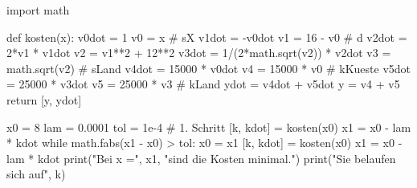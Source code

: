 \documentclass[
  a4paper,
  DIV=11]{scrreprt}
\newenvironment{Shaded}{\begin{snugshade}}{\end{snugshade}}
\newcommand{\BuiltInTok}[1]{\textcolor[rgb]{0.00,0.23,0.31}{#1}}
\newcommand{\CommentTok}[1]{\textcolor[rgb]{0.37,0.37,0.37}{#1}}
\newcommand{\ControlFlowTok}[1]{\textcolor[rgb]{0.00,0.23,0.31}{#1}}
\newcommand{\DecValTok}[1]{\textcolor[rgb]{0.68,0.00,0.00}{#1}}
\newcommand{\FloatTok}[1]{\textcolor[rgb]{0.68,0.00,0.00}{#1}}
\newcommand{\ImportTok}[1]{\textcolor[rgb]{0.00,0.46,0.62}{#1}}
\newcommand{\KeywordTok}[1]{\textcolor[rgb]{0.00,0.23,0.31}{#1}}
\newcommand{\NormalTok}[1]{\textcolor[rgb]{0.00,0.23,0.31}{#1}}
\newcommand{\OperatorTok}[1]{\textcolor[rgb]{0.37,0.37,0.37}{#1}}
\newcommand{\StringTok}[1]{\textcolor[rgb]{0.13,0.47,0.30}{#1}}
\theoremstyle{definition}
\theoremstyle{definition}
\theoremstyle{remark}
\begin{document}
\begin{tcolorbox}[enhanced jigsaw, titlerule=0mm, title=\textcolor{quarto-callout-tip-color}{\faLightbulb}\hspace{0.5em}{Lösung}, breakable, coltitle=black, leftrule=.75mm, bottomrule=.15mm, colback=white, rightrule=.15mm, opacitybacktitle=0.6, bottomtitle=1mm, toptitle=1mm, left=2mm, toprule=.15mm, colbacktitle=quarto-callout-tip-color!10!white, colframe=quarto-callout-tip-color-frame, arc=.35mm, opacityback=0]

\begin{Shaded}
\begin{Highlighting}[]
\ImportTok{import}\NormalTok{ math}

\KeywordTok{def}\NormalTok{ kosten(x):}
\NormalTok{    v0dot }\OperatorTok{=} \DecValTok{1}
\NormalTok{    v0 }\OperatorTok{=}\NormalTok{ x       }\CommentTok{\# sX}
\NormalTok{    v1dot }\OperatorTok{=} \OperatorTok{{-}}\NormalTok{v0dot}
\NormalTok{    v1 }\OperatorTok{=} \DecValTok{16} \OperatorTok{{-}}\NormalTok{ v0 }\CommentTok{\# d}
\NormalTok{    v2dot }\OperatorTok{=} \DecValTok{2}\OperatorTok{*}\NormalTok{v1 }\OperatorTok{*}\NormalTok{ v1dot}
\NormalTok{    v2 }\OperatorTok{=}\NormalTok{ v1}\OperatorTok{**}\DecValTok{2} \OperatorTok{+} \DecValTok{12}\OperatorTok{**}\DecValTok{2}
\NormalTok{    v3dot }\OperatorTok{=} \DecValTok{1}\OperatorTok{/}\NormalTok{(}\DecValTok{2}\OperatorTok{*}\NormalTok{math.sqrt(v2)) }\OperatorTok{*}\NormalTok{ v2dot}
\NormalTok{    v3 }\OperatorTok{=}\NormalTok{ math.sqrt(v2) }\CommentTok{\# sLand}
\NormalTok{    v4dot }\OperatorTok{=} \DecValTok{15000} \OperatorTok{*}\NormalTok{ v0dot}
\NormalTok{    v4 }\OperatorTok{=} \DecValTok{15000} \OperatorTok{*}\NormalTok{ v0 }\CommentTok{\# kKueste}
\NormalTok{    v5dot }\OperatorTok{=} \DecValTok{25000} \OperatorTok{*}\NormalTok{ v3dot}
\NormalTok{    v5 }\OperatorTok{=} \DecValTok{25000} \OperatorTok{*}\NormalTok{ v3 }\CommentTok{\# kLand}
\NormalTok{    ydot }\OperatorTok{=}\NormalTok{ v4dot }\OperatorTok{+}\NormalTok{ v5dot}
\NormalTok{    y }\OperatorTok{=}\NormalTok{ v4 }\OperatorTok{+}\NormalTok{ v5}
    \ControlFlowTok{return}\NormalTok{ [y, ydot]}

\NormalTok{x0 }\OperatorTok{=} \DecValTok{8}
\NormalTok{lam }\OperatorTok{=} \FloatTok{0.0001}
\NormalTok{tol }\OperatorTok{=} \FloatTok{1e{-}4}
\CommentTok{\# 1. Schritt}
\NormalTok{[k, kdot] }\OperatorTok{=}\NormalTok{ kosten(x0)}
\NormalTok{x1 }\OperatorTok{=}\NormalTok{ x0 }\OperatorTok{{-}}\NormalTok{ lam }\OperatorTok{*}\NormalTok{ kdot}
\ControlFlowTok{while}\NormalTok{ math.fabs(x1 }\OperatorTok{{-}}\NormalTok{ x0) }\OperatorTok{\textgreater{}}\NormalTok{ tol:}
\NormalTok{    x0 }\OperatorTok{=}\NormalTok{ x1}
\NormalTok{    [k, kdot] }\OperatorTok{=}\NormalTok{ kosten(x0)}
\NormalTok{    x1 }\OperatorTok{=}\NormalTok{ x0 }\OperatorTok{{-}}\NormalTok{ lam }\OperatorTok{*}\NormalTok{ kdot}
\BuiltInTok{print}\NormalTok{(}\StringTok{"Bei x ="}\NormalTok{, x1, }\StringTok{"sind die Kosten minimal."}\NormalTok{)}
\BuiltInTok{print}\NormalTok{(}\StringTok{"Sie belaufen sich auf"}\NormalTok{, k)}
\end{Highlighting}
\end{Shaded}


\end{tcolorbox}
\end{document}
